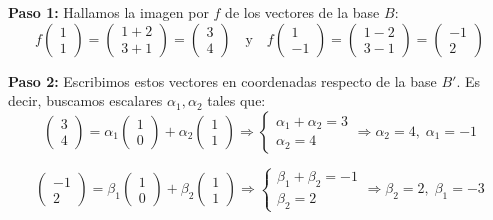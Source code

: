 \begin{ejemplo}
\vspace{0.5em}
\textbf{Paso 1:} Hallamos la imagen por \(f\) de los vectores de la base \(B\):
\[
f\begin{pmatrix}1 \\ 1\end{pmatrix} = \begin{pmatrix}1 + 2 \\ 3 + 1\end{pmatrix} = \begin{pmatrix}3 \\ 4\end{pmatrix}
\quad \text{y} \quad
f\begin{pmatrix}1 \\ -1\end{pmatrix} = \begin{pmatrix}1 - 2 \\ 3 - 1\end{pmatrix} = \begin{pmatrix}-1 \\ 2\end{pmatrix}
\]

\vspace{0.5em}
\textbf{Paso 2:} Escribimos estos vectores en coordenadas respecto de la base \(B'\). Es decir, buscamos escalares \(\alpha_1, \alpha_2\) tales que:
\[
\begin{pmatrix}3 \\ 4\end{pmatrix} = \alpha_1 \begin{pmatrix}1 \\ 0\end{pmatrix} + \alpha_2 \begin{pmatrix}1 \\ 1\end{pmatrix}
\Rightarrow
\begin{cases}
\alpha_1 + \alpha_2 = 3 \\
\alpha_2 = 4
\end{cases}
\Rightarrow \alpha_2 = 4,\; \alpha_1 = -1
\]

\[
\begin{pmatrix}-1 \\ 2\end{pmatrix} = \beta_1 \begin{pmatrix}1 \\ 0\end{pmatrix} + \beta_2 \begin{pmatrix}1 \\ 1\end{pmatrix}
\Rightarrow
\begin{cases}
\beta_1 + \beta_2 = -1 \\
\beta_2 = 2
\end{cases}
\Rightarrow \beta_2 = 2,\; \beta_1 = -3
\]


\end{ejemplo}

